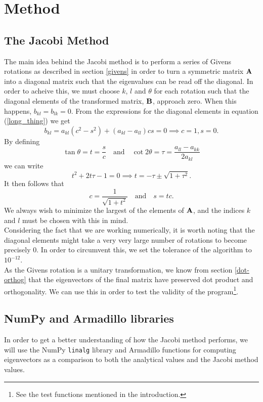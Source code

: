 \documentclass[notitlepage, reprint, nofootinbib]{revtex4-1}
\begin{document}
\section{Method}
\subsection{The Jacobi Method}
The main idea behind the Jacobi method is to perform a series of Givens rotations as described in section \ref{givens} in order to turn a symmetric matrix $\vb{A}$ into a diagonal matrix such that the eigenvalues can be read off the diagonal. In order to acheive this, we must choose $k$, $l$ and $\theta$ for each rotation such that the diagonal elements of the transformed matrix, $\vb{B}$, approach zero. When this happens, $b_{kl}=b_{lk}=0$. From the expressions for the diagonal elements in equation (\ref{long_thing}) we get 
$$b_{kl}=a_{kl}(c^2-s^2)+(a_{kl}-a_{ll})cs=0\implies c=1, s=0.$$ 
By defining 
$$\tan\theta=t=\frac{s}{c}\quad\text{and}\quad \cot 2\theta=\tau=\frac{a_{ll}-a_{kk}}{2a_{kl}}$$
we can write
$$t^2+2t\tau-1=0\implies t=-\tau \pm \sqrt{1+\tau^2}.$$
It then follows that 
$$c=\frac{1}{\sqrt{1+t^2}}\quad \text{and}\quad s=tc.$$
We always wish to minimize the largest of the elements of $\vb{A}$, and the indices $k$ and $l$ must be chosen with this in mind. \\[2mm]
Considering the fact that we are working numerically, it is worth noting that the diagonal elements might take a very very large number of rotations to become precisely 0. In order to circumvent this, we set the tolerance of the algorithm to $10^{-12}$.\\[2mm]
As the Givens rotation is a unitary transformation, we know from section \ref{dot-orthog} that the eigenvectors of the final matrix have preserved dot product and orthogonality. We can use this in order to test the validity of the program\footnote{See the test functions mentioned in the introduction.}.   
\subsection{NumPy and Armadillo libraries}
In order to get a better understanding of how the Jacobi method performs, we will use the NumPy \texttt{linalg} library\cite{NumPy_linalg} and Armadillo functions\cite{Arma1}\cite{Arma2} for computing eigenvectors as a comparison to both the analytical values and the Jacobi method values. 
\end{document}
